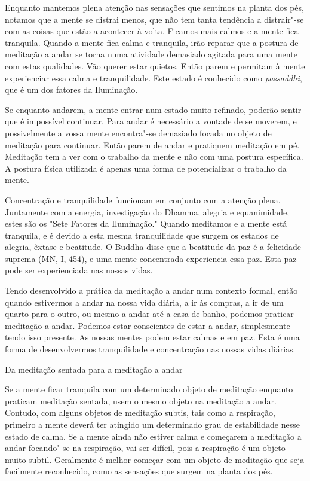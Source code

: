 Enquanto mantemos plena atenção nas sensações que sentimos na planta dos
pés, notamos que a mente se distrai menos, que não tem tanta tendência a
distrair"-se com as coisas que estão a acontecer à volta. Ficamos mais
calmos e a mente fica tranquila. Quando a mente fica calma e tranquila,
irão reparar que a postura de meditação a andar se torna numa atividade
demasiado agitada para uma mente com estas qualidades. Vão querer estar
quietos. Então parem e permitam à mente experienciar essa calma e
tranquilidade. Este estado é conhecido como \emph{passaddhi}, que é um
dos fatores da Iluminação.

Se enquanto andarem, a mente entrar num estado muito refinado, poderão
sentir que é impossível continuar. Para andar é necessário a vontade de
se moverem, e possivelmente a vossa mente encontra"-se demasiado focada
no objeto de meditação para continuar. Então parem de andar e pratiquem
meditação em pé. Meditação tem a ver com o trabalho da mente e não com
uma postura específica. A postura física utilizada é apenas uma forma de
potencializar o trabalho da mente.

Concentração e tranquilidade funcionam em conjunto com a atenção plena.
Juntamente com a energia, investigação do Dhamma, alegria e
equanimidade, estes são os "Sete Fatores da Iluminação." Quando
meditamos e a mente está tranquila, e é devido a esta mesma
tranquilidade que surgem os estados de alegria, êxtase e beatitude. O
Buddha disse que a beatitude da paz é a felicidade suprema (MN, I, 454),
e uma mente concentrada experiencia essa paz. Esta paz pode ser
experienciada nas nossas vidas.

Tendo desenvolvido a prática da meditação a andar num contexto formal,
então quando estivermos a andar na nossa vida diária, a ir às compras, a
ir de um quarto para o outro, ou mesmo a andar até a casa de banho,
podemos praticar meditação a andar. Podemos estar conscientes de estar a
andar, simplesmente tendo isso presente. As nossas mentes podem estar
calmas e em paz. Esta é uma forma de desenvolvermos tranquilidade e
concentração nas nossas vidas diárias.

\begin{siderule-quote}
  Da meditação sentada para a meditação a andar
\end{siderule-quote}

Se a mente ficar tranquila com um determinado objeto de meditação
enquanto praticam meditação sentada, usem o mesmo objeto na meditação a
andar. Contudo, com alguns objetos de meditação subtis, tais como a
respiração, primeiro a mente deverá ter atingido um determinado grau de
estabilidade nesse estado de calma. Se a mente ainda não estiver calma e
começarem a meditação a andar focando"-se na respiração, vai ser difícil,
pois a respiração é um objeto muito subtil. Geralmente é melhor começar
com um objeto de meditação que seja facilmente reconhecido, como as
sensações que surgem na planta dos pés.

